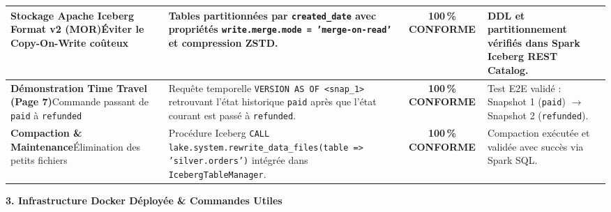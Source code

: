 \documentclass[9pt,a4paper,landscape]{article}
\begin{document}
\begin{tabularx}{\textwidth}{p{6cm} p{9.2cm} c p{5.5cm}}
\midrule
\textbf{Stockage Apache Iceberg Format v2 (MOR)}\newline Éviter le Copy-On-Write coûteux & Tables partitionnées par \texttt{created\_date} avec propriétés \texttt{write.merge.mode = 'merge-on-read'} et compression ZSTD. & \cellcolor{successbg}\color{successtext}\textbf{100\,\% CONFORME} & DDL et partitionnement vérifiés dans Spark Iceberg REST Catalog. \\
\midrule
\textbf{Démonstration Time Travel (Page 7)}\newline Commande passant de \texttt{paid} à \texttt{refunded} & Requête temporelle \texttt{VERSION AS OF <snap\_1>} retrouvant l'état historique \texttt{paid} après que l'état courant est passé à \texttt{refunded}. & \cellcolor{successbg}\color{successtext}\textbf{100\,\% CONFORME} & Test E2E validé : Snapshot 1 (\texttt{paid}) $\to$ Snapshot 2 (\texttt{refunded}). \\
\midrule
\textbf{Compaction \& Maintenance}\newline Élimination des petits fichiers & Procédure Iceberg \texttt{CALL lake.system.rewrite\_data\_files(table => 'silver.orders')} intégrée dans \texttt{IcebergTableManager}. & \cellcolor{successbg}\color{successtext}\textbf{100\,\% CONFORME} & Compaction exécutée et validée avec succès via Spark SQL. \\
\bottomrule
\end{tabularx}

\vspace{0.25cm}

\noindent
\textbf{\normalsize \color{primary}3. Infrastructure Docker Déployée \& Commandes Utiles}

\vspace{0.1cm}
\end{document}
